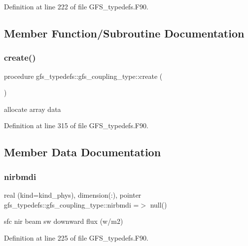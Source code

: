 Definition at line 222 of file G\+F\+S\+\_\+typedefs.\+F90.



\subsection{Member Function/\+Subroutine Documentation}
\mbox{\label{structgfs__typedefs_1_1gfs__coupling__type_a5b91c1b62568b1b26db2fbc5645a336f}} 
\subsubsection{create()}
{\footnotesize\ttfamily procedure gfs\+\_\+typedefs\+::gfs\+\_\+coupling\+\_\+type\+::create (\begin{DoxyParamCaption}{ }\end{DoxyParamCaption})}



allocate array data 



Definition at line 315 of file G\+F\+S\+\_\+typedefs.\+F90.



\subsection{Member Data Documentation}
\mbox{\label{structgfs__typedefs_1_1gfs__coupling__type_a6a55a253f9a7dd6022fe91cfd54660bd}} 
\subsubsection{nirbmdi}
{\footnotesize\ttfamily real (kind=kind\+\_\+phys), dimension(\+:), pointer gfs\+\_\+typedefs\+::gfs\+\_\+coupling\+\_\+type\+::nirbmdi =$>$ null()}



sfc nir beam sw downward flux (w/m2) 



Definition at line 225 of file G\+F\+S\+\_\+typedefs.\+F90.


